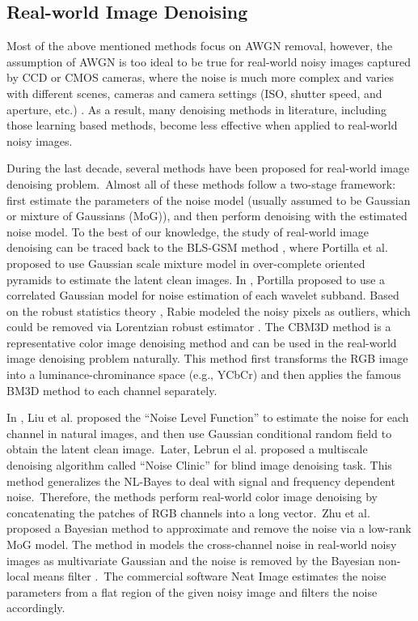 \subsection{Real-world Image Denoising}
\label{sec:review:feature}

Most of the above mentioned methods focus on AWGN removal, however, the assumption of AWGN is too ideal to be true for real-world noisy images captured by CCD or CMOS cameras, where the noise is much more complex and varies with different scenes, cameras and camera settings (ISO, shutter speed, and aperture, etc.) \cite{crosschannel2016,karaimer_brown_ECCV_2016,dnd2017}. As a result, many denoising methods in literature, including those learning based methods, become less effective when applied to real-world noisy images.

During the last decade, several methods \cite{blsgsm,fullyblind,huber2011robust,rabie2005robust,cbm3d,Liu2008,noiseclinic,Zhu_2016_CVPR,
crosschannel2016,neatimage} have been proposed for real-world image denoising problem.\ Almost all of these methods follow a two-stage framework: first estimate the parameters of the noise model (usually assumed to be Gaussian or mixture of Gaussians (MoG)), and then perform denoising with the estimated noise model. To the best of our knowledge, the study of real-world image denoising can be traced back to the BLS-GSM method \cite{blsgsm}, where Portilla et al. proposed to use Gaussian scale mixture model in over-complete oriented pyramids to estimate the latent clean images. In \cite{fullyblind}, Portilla proposed to use a correlated Gaussian model for noise estimation of each wavelet subband. Based on the robust statistics theory \cite{huber2011robust}, Rabie modeled the noisy pixels as outliers, which could be removed via Lorentzian robust estimator \cite{rabie2005robust}. The CBM3D method \cite{cbm3d} is a representative color image denoising method and can be used in the real-world image denoising problem naturally. This method first transforms the RGB image into a luminance-chrominance space (e.g., YCbCr) and then applies the famous BM3D method \cite{bm3d} to each channel separately.

In \cite{Liu2008}, Liu et al. proposed the ``Noise Level Function'' to estimate the noise for each channel in natural images, and then use Gaussian conditional random field to obtain the latent clean image.\ Later, Lebrun el al. proposed a multiscale denoising algorithm called ``Noise Clinic'' \cite{noiseclinic} for blind image denoising task. This method generalizes the NL-Bayes \cite{nlbayes} to deal with signal and frequency dependent noise.\ Therefore, the methods \cite{noiseclinic,ncwebsite,Zhu_2016_CVPR} perform real-world color image denoising by concatenating the patches of RGB channels into a long vector.\ Zhu et al. \cite{Zhu_2016_CVPR} proposed a Bayesian method to approximate and remove the noise via a low-rank MoG model. The method in \cite{crosschannel2016} models the cross-channel noise in real-world noisy images as multivariate Gaussian and the noise is removed by the Bayesian non-local means filter \cite{kervrann2007bayesian}.\ The commercial software Neat Image \cite{neatimage} estimates the noise parameters from a flat region of the given noisy image and filters the noise accordingly. 


